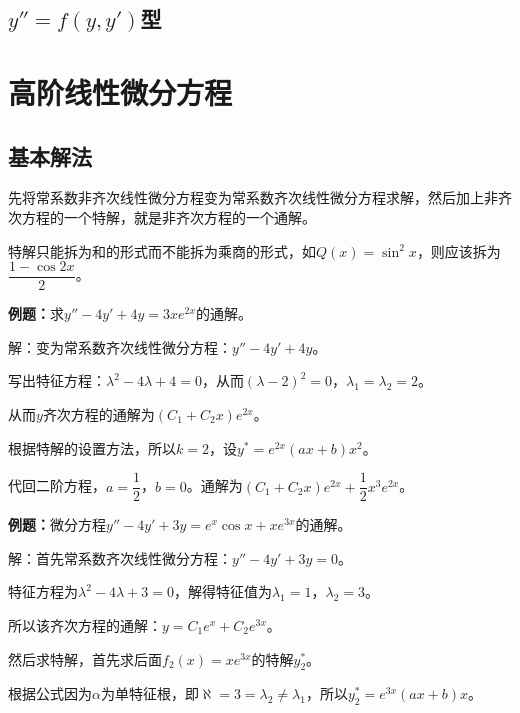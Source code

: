 \documentclass[UTF8, 12pt]{ctexart}
\begin{document}
\subsection{\texorpdfstring{$y''=f(y,y')$}\ 型}

\section{高阶线性微分方程}



\subsection{基本解法}

先将常系数非齐次线性微分方程变为常系数齐次线性微分方程求解，然后加上非齐次方程的一个特解，就是非齐次方程的一个通解。

特解只能拆为和的形式而不能拆为乘商的形式，如$Q(x)=\sin^2x$，则应该拆为$\dfrac{1-\cos2x}{2}$。

\textbf{例题：}求$y''-4y'+4y=3xe^{2x}$的通解。

解：变为常系数齐次线性微分方程：$y''-4y'+4y$。

写出特征方程：$\lambda^2-4\lambda+4=0$，从而$(\lambda-2)^2=0$，$\lambda_1=\lambda_2=2$。

从而$y$齐次方程的通解为$(C_1+C_2x)e^{2x}$。

根据特解的设置方法，所以$k=2$，设$y^*=e^{2x}(ax+b)x^2$。

代回二阶方程，$a=\dfrac{1}{2}$，$b=0$。通解为$(C_1+C_2x)e^{2x}+\dfrac{1}{2}x^3e^{2x}$。

\textbf{例题：}微分方程$y''-4y'+3y=e^x\cos x+xe^{3x}$的通解。

解：首先常系数齐次线性微分方程：$y''-4y'+3y=0$。

特征方程为$\lambda^2-4\lambda+3=0$，解得特征值为$\lambda_1=1$，$\lambda_2=3$。

所以该齐次方程的通解：$y=C_1e^x+C_2e^{3x}$。

然后求特解，首先求后面$f_2(x)=xe^{3x}$的特解$y_2^*$。

根据公式因为$\alpha$为单特征根，即$\aleph=3=\lambda_2\neq\lambda_1$，所以$y_2^*=e^{3x}(ax+b)x$。
\end{document}
